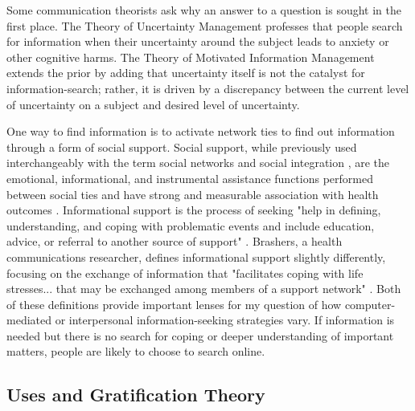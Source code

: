 Some communication theorists ask why an answer to a question is sought
in the first place. The Theory of Uncertainty Management \citep{brashersCommunicationUncertaintyManagement2001}
professes that people search for information when their uncertainty
around the subject leads to anxiety or other cognitive harms. The Theory
of Motivated Information Management \citep{afifiSeekingInformationSexual2006, afifiTheoryMotivatedInformation2004}
extends the prior by adding that uncertainty itself is not the catalyst
for information-search; rather, it is driven by a discrepancy between
the current level of uncertainty on a subject and desired level of
uncertainty.

One way to find information is to activate network ties to find out
information through a form of social support. Social support, while
previously used interchangeably with the term social networks and social
integration \citep{houseStructuresProcessesSocial1988}, are the emotional,
informational, and instrumental assistance functions performed between
social ties and have strong and measurable association with health
outcomes \citep{houseMeasuresConceptsSocial1985, thoitsMechanismsLinkingSocial2011}. Informational support is
the process of seeking "help in defining, understanding, and coping with
problematic events and include education, advice, or referral to another
source of support" \citep[p. 640]{winemiller_etal93}. Brashers, a health
communications researcher, defines informational support slightly
differently, focusing on the exchange of information that "facilitates
coping with life stresses... that may be exchanged among members of a
support network" \citeyearpar[p. 260]{brashersInformationSeekingAvoiding2002}.
Both of these definitions provide important
lenses for my question of how computer-mediated or interpersonal
information-seeking strategies vary. If information is needed but there
is no search for coping or deeper understanding of important matters,
people are likely to choose to search online.

\subsection{Uses and Gratification Theory}

